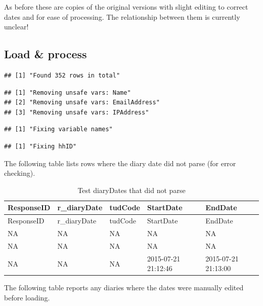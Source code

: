 \documentclass[]{article}
\begin{document}
As before these are copies of the original versions with slight editing
to correct dates and for ease of processing. The relationship between
them is currently unclear!

\subsection{Load \& process}\label{load-process-1}

\begin{verbatim}
## [1] "Found 352 rows in total"
\end{verbatim}

\begin{verbatim}
## [1] "Removing unsafe vars: Name"        
## [2] "Removing unsafe vars: EmailAddress"
## [3] "Removing unsafe vars: IPAddress"
\end{verbatim}

\begin{verbatim}
## [1] "Fixing variable names"
\end{verbatim}

\begin{verbatim}
## [1] "Fixing hhID"
\end{verbatim}

The following table lists rows where the diary date did not parse (for
error checking).

\begin{longtable}[]{@{}lllll@{}}
\caption{Test diaryDates that did not parse}\tabularnewline
\toprule
ResponseID & r\_diaryDate & tudCode & StartDate & EndDate\tabularnewline
\midrule
\endfirsthead
\toprule
ResponseID & r\_diaryDate & tudCode & StartDate & EndDate\tabularnewline
\midrule
\endhead
NA & NA & NA & NA & NA\tabularnewline
NA & NA & NA & NA & NA\tabularnewline
NA & NA & NA & 2015-07-21 21:12:46 & 2015-07-21 21:13:00\tabularnewline
\bottomrule
\end{longtable}

The following table reports any diaries where the dates were manually
edited before loading.
\end{document}
